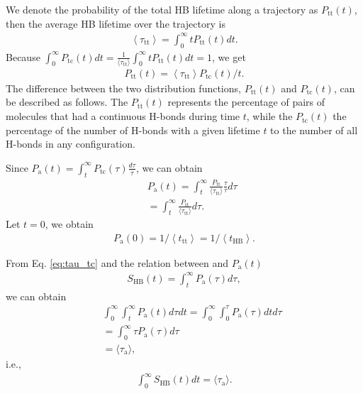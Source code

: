 {We denote the probability of the total HB lifetime along a trajectory as $P_{\mathrm{tt}}(t)$,
then the average HB lifetime over the trajectory is
\begin{eqnarray}
\left\langle\tau_{\mathrm{tt}}\right\rangle=\int_{0}^{\infty} t P_{\mathrm{tt}}(t) d t.
\label{eq:relation_tau_tt}
\end{eqnarray}
Because $\int_{0}^{\infty} P_{\mathrm{tc}}(t) d t=\frac{1}{\langle \tau_\text{tt}\rangle} \int_{0}^{\infty} t P_{\mathrm{tt}}(t) d t = 1$, 
we get 
\begin{eqnarray}
P_{\mathrm{tt}}(t)=\left\langle \tau_{\mathrm{tt}}\right\rangle P_{\mathrm{tc}}(t) / t.
\label{eq:relation_P_tt--P_tc}
\end{eqnarray}
The difference between the two distribution functions, $P_{\mathrm{tt}}(t)$ and $P_{\mathrm{tc}}(t)$, can be described as follows.
The $P_{\mathrm{tt}}(t)$ represents the percentage of pairs of molecules that had a continuous H-bonds during time $t$, 
while the $P_{\mathrm{tc}}(t)$ the percentage of the number of H-bonds with a given lifetime $t$ to the number of all H-bonds in any configuration. 
\cite{Voloshin2009}

Since $P_{\mathrm{a}}(t)=\int_{t}^{\infty} P_{\mathrm{tc}}(\tau) \frac{d \tau}{\tau}$,
we can obtain
\begin{eqnarray}
&& P_{\mathrm{a}}(t)=\int_t^\infty \frac{P_\text{tt}}{\langle\tau_\text{tt}\rangle} \frac{\tau}{\tau} d\tau \nonumber \\
&& =  \int_t^\infty \frac{P_\text{tt}}{\langle\tau_\text{tt}\rangle}d\tau. \nonumber
\label{eq:P_a}
\end{eqnarray}
Let $t=0$, we obtain
\begin{eqnarray}
P_{\mathrm{a}}(0)=1 /\left\langle t_{\mathrm{tt}}\right\rangle = 1 /\left\langle t_{\mathrm{HB}}\right\rangle.
\label{eq:P_a0}
\end{eqnarray}

From Eq. \ref{eq:tau_tc} and the relation between \SHB and $P_{\mathrm{a}}(t)$
\begin{eqnarray}
S_{\mathrm{HB}}(t)=\int_{t}^{\infty} P_{\mathrm{a}}(\tau) d \tau,
\label{eq:P_a}
\end{eqnarray}
we can obtain
%
\begin{eqnarray}
&&\int_{0}^{\infty} \int_{t}^{\infty} P_\text{a}(t) d \tau d t = \int_{0}^{\infty} \int_{0}^{\tau} P_\text{a}(\tau) d t d \tau \nonumber \\
&& = \int_{0}^{\infty} \tau P_\text{a}(\tau) d \tau \nonumber \\
&& = \langle \tau_{\mathrm{a}} \rangle, \nonumber
\end{eqnarray}
i.e., 
\begin{eqnarray}
\int_{0}^{\infty}  S_{\mathrm{HB}}(t) d t = \langle \tau_{\mathrm{a}} \rangle.
\label{eq:int_Ca}
\end{eqnarray}
}
